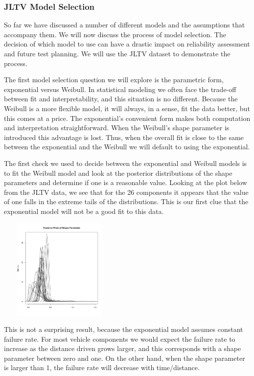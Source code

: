 \documentclass[12pt]{article}
\begin{document}
\subsubsection{JLTV Model Selection}
So far we have discussed a number of different models and the assumptions that
accompany them.  We will now discuss the process of model selection.  The
decision of which model to use can have a drastic impact on reliability
assessment and future test planning.  We will use the JLTV dataset to
demonstrate the process.

The first model selection question we will explore is the parametric form,
exponential versus Weibull.  In statistical modeling we often face the
trade-off between fit and interpretability, and this situation is no different.
Because the Weibull is a more flexible model, it will always, in a sense, fit the
data better, but this comes at a price.  The exponential's convenient form
makes both computation and interpretation straightforward.  When the Weibull's
shape parameter is introduced this advantage is lost.  Thus, when the overall
fit is close to the same between the exponential and the Weibull we will
default to using the exponential.

The first check we used to decide between the exponential and Weibull models is
to fit the Weibull model and look at the posterior distributions of the
shape parameters and determine if one is a reasonable value.  Looking at the
plot below from the JLTV data, we see that for the 26 components it appears
that the value of one falls in the extreme tails of the distributions.  This is
our first clue that the exponential model will not be a good fit to this data.

\includegraphics[width=6cm, height=5cm]{betaPostPlot}

This is not a surprising result, because the exponential model assumes constant
failure rate.  For most vehicle components we would expect the failure rate to
increase as the distance driven grows larger, and this corresponds with a shape
parameter between zero and one.  On the other hand, when the shape parameter is
larger than 1, the failure rate will decrease with time/distance.
\end{document}
